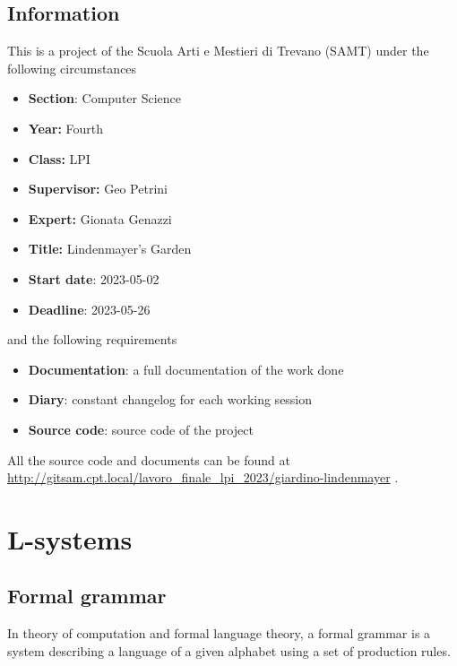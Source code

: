 \documentclass[a4paper]{article}
\begin{document}
\subsection{Information}

This is a project of the Scuola Arti e Mestieri di Trevano (SAMT) under the following circumstances

\begin{itemize}
    \item \textbf{Section}: Computer Science
    \item \textbf{Year:} Fourth
    \item \textbf{Class:} LPI
    \item \textbf{Supervisor:} Geo Petrini
    \item \textbf{Expert:} Gionata Genazzi
    \item \textbf{Title:} Lindenmayer's Garden
    \item \textbf{Start date}: 2023-05-02
    \item \textbf{Deadline}: 2023-05-26
\end{itemize}

and the following requirements

\begin{itemize}
    \item \textbf{Documentation}: a full documentation of the work done
    \item \textbf{Diary}: constant changelog for each working session
    \item \textbf{Source code}: source code of the project
\end{itemize}

All the source code and documents can be found at
\href{http://gitsam.cpt.local/lavoro\_finale\_lpi\_2023/giardino-lindenmayer}
{http://gitsam.cpt.local/lavoro\_finale\_lpi\_2023/giardino-lindenmayer}
\cite{gitrepo}.

\pagebreak

\section{L-systems}

\subsection{Formal grammar}

In theory of computation and formal language theory, a formal grammar\cite{formalgrammar} is a system
describing a language of a given alphabet using a set of production rules.
\end{document}
